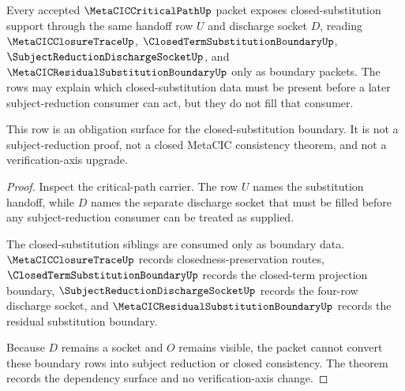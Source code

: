 \begin{theorem}
\label{thm:metacic-critical-path-closed-substitution-boundary-exposure}
Every accepted $\MetaCICCriticalPathUp$ packet exposes closed-substitution support through the same handoff row $U$ and discharge socket $D$, reading $\MetaCICClosureTraceUp$, $\ClosedTermSubstitutionBoundaryUp$, $\SubjectReductionDischargeSocketUp$, and $\MetaCICResidualSubstitutionBoundaryUp$ only as boundary packets. The rows may explain which closed-substitution data must be present before a later subject-reduction consumer can act, but they do not fill that consumer.

This row is an obligation surface for the closed-substitution boundary. It is not a subject-reduction proof, not a closed MetaCIC consistency theorem, and not a verification-axis upgrade.
\end{theorem}
\begin{proof}
Inspect the critical-path carrier. The row $U$ names the substitution handoff, while $D$ names the separate discharge socket that must be filled before any subject-reduction consumer can be treated as supplied.

The closed-substitution siblings are consumed only as boundary data. $\MetaCICClosureTraceUp$ records closedness-preservation routes, $\ClosedTermSubstitutionBoundaryUp$ records the closed-term projection boundary, $\SubjectReductionDischargeSocketUp$ records the four-row discharge socket, and $\MetaCICResidualSubstitutionBoundaryUp$ records the residual substitution boundary.

Because $D$ remains a socket and $O$ remains visible, the packet cannot convert these boundary rows into subject reduction or closed consistency. The theorem records the dependency surface and no verification-axis change.
\end{proof}

